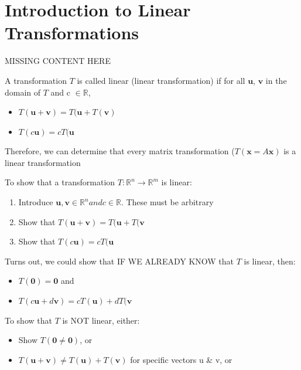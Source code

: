 \documentclass{report}
\begin{document}
\section{Introduction to Linear Transformations}
\begin{definition}
	MISSING CONTENT HERE
\end{definition}
\begin{definition}
A transformation $T$ is called linear (linear transformation) if for all $\mathbf{u}$, $\mathbf{v}$ in the domain of $T$ and c $\in \mathbb{R}$,
\begin{itemize}
	\item $T(\mathbf{u}+\mathbf{v}) = T(\mathbf{u} + T(\mathbf{v})$
	\item $T(c\mathbf{u}) = cT(\mathbf{u}$
\end{itemize}
Therefore, we can determine that every matrix transformation ($T(\mathbf{x} = A\mathbf{x})$ is a linear transformation
\end{definition}
To show that a transformation $T:\mathbb{R}^n \rightarrow \mathbb{R}^m$ is linear:
\begin{enumerate}
	\item Introduce $\mathbf{u}, \mathbf{v}\in\mathbb{R}^n and c\in\mathbb{R}.$ These must be arbitrary
	\item Show that $T(\mathbf{u}+\mathbf{v}) = T(\mathbf{u} + T(\mathbf{v}$
	\item Show that $T(c\mathbf{u}) = cT(\mathbf{u}$
\end{enumerate}
Turns out, we could show that IF WE ALREADY KNOW that $T$ is linear, then:
\begin{itemize}
	\item $T(\mathbf{0}) = \mathbf{0}$ and
	\item $T(c\mathbf{u}+d\mathbf{v}) = cT(\mathbf{u}) + dT(\mathbf{v}$
\end{itemize}
To show that $T$ is NOT linear, either:
\begin{itemize}
	\item Show $T(\mathbf{0}\neq\mathbf{0})$, or
	\item $T(\mathbf{u} + \mathbf{v}) \neq T(\mathbf{u}) + T(\mathbf{v})$ for specific vectors u \& v, or
\end{itemize}
\end{document}
